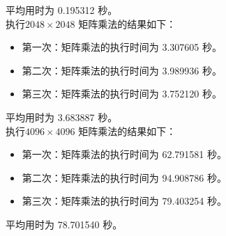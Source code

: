 \documentclass[a4paper,12pt]{ctexart}
\begin{document}
平均用时为 0.195312 秒。\\

执行$2048 \times 2048$ 矩阵乘法的结果如下：
\begin{itemize}
    \item 第一次：矩阵乘法的执行时间为 3.307605 秒。
    \item 第二次：矩阵乘法的执行时间为 3.989936 秒。
    \item 第三次：矩阵乘法的执行时间为 3.752120 秒。
\end{itemize}

平均用时为 3.683887 秒。\\

执行$4096 \times 4096$ 矩阵乘法的结果如下：
\begin{itemize}
    \item 第一次：矩阵乘法的执行时间为 62.791581 秒。
    \item 第二次：矩阵乘法的执行时间为 94.908786 秒。
    \item 第三次：矩阵乘法的执行时间为 79.403254 秒。
\end{itemize}

平均用时为 78.701540 秒。
\end{document}
